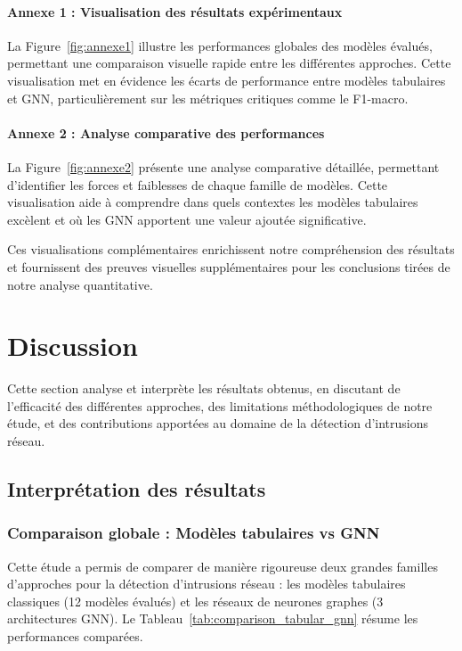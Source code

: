 ﻿\documentclass[11pt,a4paper]{article}
\begin{document}
\paragraph{Annexe 1 : Visualisation des résultats expérimentaux}
La Figure~\ref{fig:annexe1} illustre les performances globales des modèles évalués, permettant une comparaison visuelle rapide entre les différentes approches. Cette visualisation met en évidence les écarts de performance entre modèles tabulaires et GNN, particulièrement sur les métriques critiques comme le F1-macro.

\paragraph{Annexe 2 : Analyse comparative des performances}
La Figure~\ref{fig:annexe2} présente une analyse comparative détaillée, permettant d'identifier les forces et faiblesses de chaque famille de modèles. Cette visualisation aide à comprendre dans quels contextes les modèles tabulaires excèlent et où les GNN apportent une valeur ajoutée significative.


Ces visualisations complémentaires enrichissent notre compréhension des résultats et fournissent des preuves visuelles supplémentaires pour les conclusions tirées de notre analyse quantitative.


\section{Discussion}
\label{sec:discussion}

Cette section analyse et interprète les résultats obtenus, en discutant de l'efficacité des différentes approches, des limitations méthodologiques de notre étude, et des contributions apportées au domaine de la détection d'intrusions réseau.

\subsection{Interprétation des résultats}

\subsubsection{Comparaison globale : Modèles tabulaires vs GNN}

Cette étude a permis de comparer de manière rigoureuse deux grandes familles d'approches pour la détection d'intrusions réseau : les modèles tabulaires classiques (12 modèles évalués) et les réseaux de neurones graphes (3 architectures GNN). Le Tableau~\ref{tab:comparison_tabular_gnn} résume les performances comparées.
\end{document}
